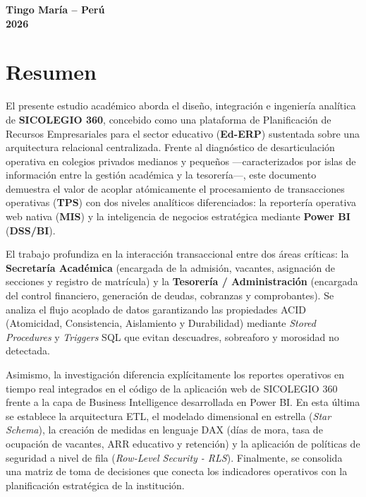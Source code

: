 \documentclass[12pt,a4paper,oneside]{report}
\begin{document}
\begin{titlepage}
\begin{center}
        \vfill
        
        {\fontsize{12}{14}\selectfont\textbf{Tingo María -- Perú}} \\[0.2cm]
        {\fontsize{12}{14}\selectfont\textbf{2026}}
    \end{center}
\end{titlepage}
\clearpage
{}
\setcounter{page}{1}

\chapter*{Resumen}

El presente estudio académico aborda el diseño, integración e ingeniería analítica de \textbf{SICOLEGIO 360}, concebido como una plataforma de Planificación de Recursos Empresariales para el sector educativo (\textbf{Ed-ERP}) sustentada sobre una arquitectura relacional centralizada. Frente al diagnóstico de desarticulación operativa en colegios privados medianos y pequeños —caracterizados por islas de información entre la gestión académica y la tesorería—, este documento demuestra el valor de acoplar atómicamente el procesamiento de transacciones operativas (\textbf{TPS}) con dos niveles analíticos diferenciados: la reportería operativa web nativa (\textbf{MIS}) y la inteligencia de negocios estratégica mediante \textbf{Power BI} (\textbf{DSS/BI}).

El trabajo profundiza en la interacción transaccional entre dos áreas críticas: la \textbf{Secretaría Académica} (encargada de la admisión, vacantes, asignación de secciones y registro de matrícula) y la \textbf{Tesorería / Administración} (encargada del control financiero, generación de deudas, cobranzas y comprobantes). Se analiza el flujo acoplado de datos garantizando las propiedades ACID (Atomicidad, Consistencia, Aislamiento y Durabilidad) mediante \textit{Stored Procedures} y \textit{Triggers} SQL que evitan descuadres, sobreaforo y morosidad no detectada.

Asimismo, la investigación diferencia explícitamente los reportes operativos en tiempo real integrados en el código de la aplicación web de SICOLEGIO 360 frente a la capa de Business Intelligence desarrollada en Power BI. En esta última se establece la arquitectura ETL, el modelado dimensional en estrella (\textit{Star Schema}), la creación de medidas en lenguaje DAX (días de mora, tasa de ocupación de vacantes, ARR educativo y retención) y la aplicación de políticas de seguridad a nivel de fila (\textit{Row-Level Security - RLS}). Finalmente, se consolida una matriz de toma de decisiones que conecta los indicadores operativos con la planificación estratégica de la institución.
\end{document}
